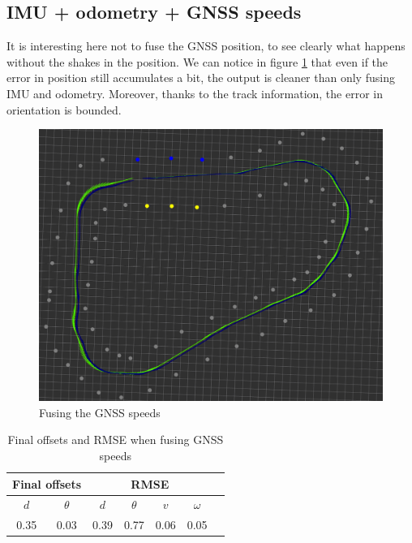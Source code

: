 \documentclass[10pt,a4paper, twocolumn]{article}
\begin{document}
\subsection{IMU + odometry + GNSS speeds}
It is interesting here not to fuse the GNSS position, to see clearly what happens without the shakes in the position. We can notice in figure \ref{fig:gnss_twist} that even if the error in position still accumulates a bit, the output is cleaner than only fusing IMU and odometry. Moreover, thanks to the track information, the error in orientation is bounded.

\begin{figure}[h]
	\centering
	\includegraphics[width=\columnwidth]{images/gnss_twist.png}
	\caption{Fusing the GNSS speeds}
	\label{fig:gnss_twist}
\end{figure}

\begin{table}[h]
	\begin{center}
		\begin{tabular}{|c|c|c|c|c|c|c|}
			\hline
			\multicolumn{2}{|c|}{\textbf{Final offsets}} &  \multicolumn{4}{c|}{\textbf{RMSE}} \\ \hline
			$d$ & $\theta$ & $d$ & $\theta$ & $v$ & $\omega$ \\ \hline
			0.35 & 0.03 & 0.39 & 0.77 & 0.06 & 0.05 \\
			\hline
			
		\end{tabular}
		\caption{Final offsets and RMSE when fusing GNSS speeds}
	\end{center}	
\end{table}
\end{document}
